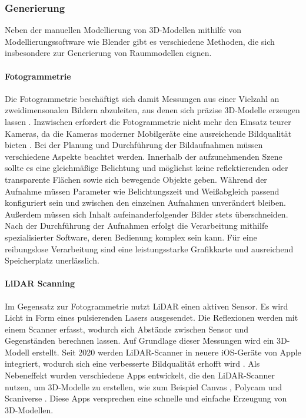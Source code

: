 \subsubsection{Generierung}
Neben der manuellen Modellierung von 3D-Modellen mithilfe von Modellierungssoftware wie Blender gibt es verschiedene Methoden, die sich insbesondere zur Generierung von Raummodellen eignen.

\paragraph{Fotogrammetrie}

Die Fotogrammetrie beschäftigt sich damit Messungen aus einer Vielzahl an zweidimensonalen Bildern abzuleiten, aus denen sich präzise 3D-Modelle erzeugen lassen \cite[S.~19]{Aber2010}. Inzwischen erfordert die Fotogrammetrie nicht mehr den Einsatz teurer Kameras, da die Kameras moderner Mobilgeräte eine ausreichende Bildqualität bieten \cite{Cohrs2021}. Bei der Planung und Durchführung der Bildaufnahmen müssen verschiedene Aspekte beachtet werden. Innerhalb der aufzunehmenden Szene sollte es eine gleichmäßige Belichtung und möglichst keine reflektierenden oder transparente Flächen sowie sich bewegende Objekte geben. Während der Aufnahme müssen Parameter wie Belichtungszeit und Weißabgleich passend konfiguriert sein und zwischen den einzelnen Aufnahmen unverändert bleiben. Außerdem müssen sich Inhalt aufeinanderfolgender Bilder stets überschneiden.\cite{Cohrs2021b} Nach der Durchführung der Aufnahmen erfolgt die Verarbeitung mithilfe spezialisierter Software, deren Bedienung komplex sein kann. Für eine reibungslose Verarbeitung sind eine leistungsstarke Grafikkarte und ausreichend Speicherplatz unerlässlich.\cite{Cohrs2021c}

\paragraph{LiDAR Scanning}
Im Gegensatz zur Fotogrammetrie nutzt \ac{LiDAR} einen aktiven Sensor. Es wird Licht in Form eines pulsierenden Lasers ausgesendet. Die Reflexionen werden mit einem Scanner erfasst, wodurch sich Abstände zwischen Sensor und Gegenständen berechnen lassen. Auf Grundlage dieser Messungen wird ein 3D-Modell erstellt. Seit 2020 werden LiDAR-Scanner in neuere iOS-Geräte von Apple integriert, wodurch sich eine verbesserte Bildqualität erhofft wird \cite{Fenstermaker2022}. Als Nebeneffekt wurden verschiedene Apps entwickelt, die den LiDAR-Scanner nutzen, um 3D-Modelle zu erstellen, wie zum Beispiel Canvas \cite{Canvas2023}, Polycam \cite{Polycam2024} und Scaniverse \cite{Scaniverse2024}. Diese Apps versprechen eine schnelle und einfache Erzeugung von 3D-Modellen.

